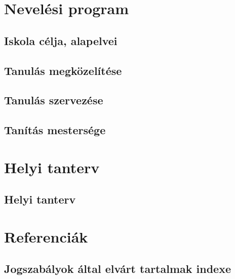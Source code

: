 \part{Nevelési program}
\chapter{Iskola célja, alapelvei}
\label{sec:alapelvek}


\chapter{Tanulás megközelítése}


\chapter{Tanulás szervezése}


\chapter{Tanítás mestersége}


\part{Helyi tanterv}
\chapter{Helyi tanterv}
\label{az-iskola-helyi-tanterve}


\part{Referenciák}
\chapter{Jogszabályok által elvárt tartalmak indexe}
